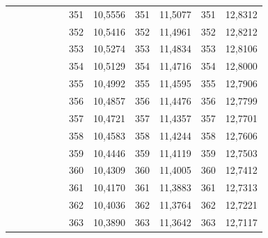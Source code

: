 \documentclass[a4paper,12pt]{article} %
\begin{document}
\begin{longtable}[c]{cccccccccc|c|c|}
	&  &  &  &  & \multicolumn{1}{c|}{} & \multicolumn{1}{c|}{351} & \multicolumn{1}{c|}{10,5556} & \multicolumn{1}{c|}{351} & 11,5077 & 351 & 12,8312 \\ \cline{7-12} 
	&  &  &  &  & \multicolumn{1}{c|}{} & \multicolumn{1}{c|}{352} & \multicolumn{1}{c|}{10,5416} & \multicolumn{1}{c|}{352} & 11,4961 & 352 & 12,8212 \\ \cline{7-12} 
	&  &  &  &  & \multicolumn{1}{c|}{} & \multicolumn{1}{c|}{353} & \multicolumn{1}{c|}{10,5274} & \multicolumn{1}{c|}{353} & 11,4834 & 353 & 12,8106 \\ \cline{7-12} 
	&  &  &  &  & \multicolumn{1}{c|}{} & \multicolumn{1}{c|}{354} & \multicolumn{1}{c|}{10,5129} & \multicolumn{1}{c|}{354} & 11,4716 & 354 & 12,8000 \\ \cline{7-12} 
	&  &  &  &  & \multicolumn{1}{c|}{} & \multicolumn{1}{c|}{355} & \multicolumn{1}{c|}{10,4992} & \multicolumn{1}{c|}{355} & 11,4595 & 355 & 12,7906 \\ \cline{7-12} 
	&  &  &  &  & \multicolumn{1}{c|}{} & \multicolumn{1}{c|}{356} & \multicolumn{1}{c|}{10,4857} & \multicolumn{1}{c|}{356} & 11,4476 & 356 & 12,7799 \\ \cline{7-12} 
	&  &  &  &  & \multicolumn{1}{c|}{} & \multicolumn{1}{c|}{357} & \multicolumn{1}{c|}{10,4721} & \multicolumn{1}{c|}{357} & 11,4357 & 357 & 12,7701 \\ \cline{7-12} 
	&  &  &  &  & \multicolumn{1}{c|}{} & \multicolumn{1}{c|}{358} & \multicolumn{1}{c|}{10,4583} & \multicolumn{1}{c|}{358} & 11,4244 & 358 & 12,7606 \\ \cline{7-12} 
	&  &  &  &  & \multicolumn{1}{c|}{} & \multicolumn{1}{c|}{359} & \multicolumn{1}{c|}{10,4446} & \multicolumn{1}{c|}{359} & 11,4119 & 359 & 12,7503 \\ \cline{7-12} 
	&  &  &  &  & \multicolumn{1}{c|}{} & \multicolumn{1}{c|}{360} & \multicolumn{1}{c|}{10,4309} & \multicolumn{1}{c|}{360} & 11,4005 & 360 & 12,7412 \\ \cline{7-12} 
	&  &  &  &  & \multicolumn{1}{c|}{} & \multicolumn{1}{c|}{361} & \multicolumn{1}{c|}{10,4170} & \multicolumn{1}{c|}{361} & 11,3883 & 361 & 12,7313 \\ \cline{7-12} 
	&  &  &  &  & \multicolumn{1}{c|}{} & \multicolumn{1}{c|}{362} & \multicolumn{1}{c|}{10,4036} & \multicolumn{1}{c|}{362} & 11,3764 & 362 & 12,7221 \\ \cline{7-12} 
	&  &  &  &  & \multicolumn{1}{c|}{} & \multicolumn{1}{c|}{363} & \multicolumn{1}{c|}{10,3890} & \multicolumn{1}{c|}{363} & 11,3642 & 363 & 12,7117 \\ \cline{7-12} 

\end{longtable}
\end{document}
